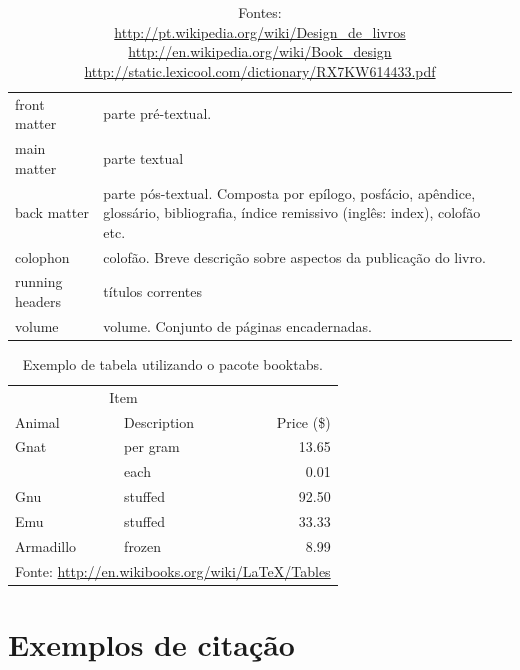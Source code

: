 \documentclass[a5paper]{memoir}
\begin{document}
\begin{table}
\begin{tabular}{p{5cm}p{5cm}}
front matter & parte pré-textual.\\

main matter & parte textual\\

back matter & parte pós-textual. Composta por epílogo, posfácio, apêndice, glossário, bibliografia, índice remissivo (inglês: index), colofão etc.\\

colophon & colofão. Breve descrição sobre aspectos da publicação do livro. \\

running headers & títulos correntes\\

volume & volume. Conjunto de páginas encadernadas.\\

\bottomrule
\end{tabular}
\caption*{\footnotesize Fontes:\\
\url{http://pt.wikipedia.org/wiki/Design_de_livros}\\
\url{http://en.wikipedia.org/wiki/Book_design}\\
\url{http://static.lexicool.com/dictionary/RX7KW614433.pdf}\\}
\end{table}


\begin{table}
\caption{Exemplo de tabela utilizando o pacote \textsf{booktabs}.}
\centering
\begin{tabular}{llr}
\toprule
\multicolumn{2}{c}{Item} \\
\cmidrule(r){1-2}
Animal    & Description & Price (\$) \\
\midrule
Gnat      & per gram    & 13.65      \\
          & each        & 0.01       \\
Gnu       & stuffed     & 92.50      \\
Emu       & stuffed     & 33.33      \\
Armadillo & frozen      & 8.99       \\
\bottomrule
\multicolumn{3}{l}{\footnotesize Fonte: \url{http://en.wikibooks.org/wiki/LaTeX/Tables}}
\end{tabular}
\end{table}

\chapter{Exemplos de citação}
\end{document}

